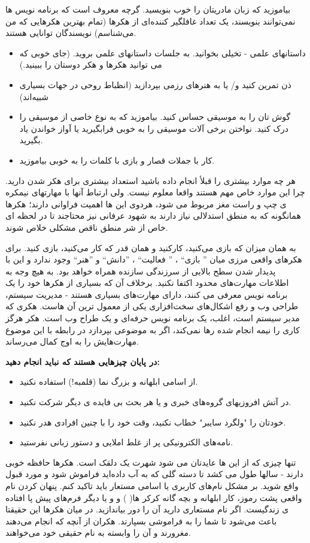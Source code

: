 بیاموزید که زبان مادریتان را خوب بنویسید. گرچه معروف است که برنامه نویس ها نمی‌توانند بنویسند، یک تعداد غافلگیر کننده‌ای از هکرها (تمام بهترین هکرهایی که من می‌شناسم) نویسندگان توانایی هستند.
\begin{itemize}
\item داستانهای علمی - تخیلی بخوانید. به جلسات داستانهای علمی بروید. (جای خوبی که می توانید هکرها و هکر دوستان را ببینید.)
\item ذن تمرین کنید و/ یا به هنرهای رزمی بپردازید (انظباط روحی در جهات بسیاری شبیه‌اند)
\item گوش تان را به موسیقی حساس کنید. بیاموزید که به نوع خاصی از موسیقی را درک کنید. نواختن برخی آلات موسیقی را به خوبی فرابگیرید یا آواز خواندن یاد بگیرید.
\item کار با جملات قصار و بازی با کلمات را به خوبی بیاموزید.
\end{itemize}
هر چه موارد بیشتری را قبلأ انجام داده باشید استعداد بیشتری برای هکر شدن دارید. چرا این موارد خاص مهم هستند واقعا معلوم نیست. ولی ارتباط آنها با مهارتهای نیمکره ی چپ و راست مغز مربوط می شود، هردوی این ها اهمیت فراوانی دارند؛ هکرها همانگونه که به منطق استدلالی نیاز دارند به شهود عرفانی نیز محتاجند تا در لحظه ای خاص از شر منطق ناقص مشکلی خلاص شوند.

به همان میزان که بازی می‌کنید، کارکنید و همان قدر که کار می‌کنید، بازی کنید. برای هکر‌های واقعی مرزی میان ” بازی“ ، ” فعالیت“ ، ”دانش“ و ”هنر“ وجود ندارد و این با پدیدار شدن سطح بالایی از سرزندگی سازنده همراه خواهد بود. به هیچ وجه به اطلاعات مهارت‌های محدود اکتفا نکنید. برخلاف آن که بسیاری از هکرها خود را یک برنامه نویس معرفی می کنند، دارای مهارت‌های بسیاری هستند - مدیریت سیستم، طراحی وب و رفع اشکال‌های سخت‌افزاری 
یکی از معمول ترین آن هاست. هکری که مدیر سیستم است، اغلب، یک برنامه نویس حرفه‌ای و یک طراح وب است. هکر هرگز کاری را نیمه انجام شده رها نمی‌کند، اگر به موضوعی بپردازد در رابطه با این موضوع مهارت‌هایش را به اوج کمال می‌رساند.

\textbf{در پایان چیزهایی هستند که نباید انجام دهید:}
\begin{itemize}
	\item از اسامی ابلهانه و بزرگ نما (قلمبه!) استفاده نکنید.
	\item در آتش افروزیهای گروه‌های خبری و یا هر بحث بی فایده ی دیگر شرکت نکنید.
	\item خودتان را "ولگرد سایبر" خطاب نکنید، وقت خود را با چنین افرادی هدر نکنید.
	\item نامه‌های الکترونیکی پر از غلط املایی و دستور زبانی نفرستید.
\end{itemize}
تنها چیزی که از این ها عایدتان می شود شهرت یک دلقک است. هکرها حافظه خوبی دارند - سالها طول می کشد تا دسته گلی که به آب داده‌اید فراموش شود و مورد قبول واقع شوید.
بر مشکل نام‌های کاربری یا اسامی مستعار باید تاکید کنم. پنهان کردن نام واقعی پشت رموز، کار ابلهانه و بچه گانه کرکر ها(
) و 
و یا دیگر فرم‌های پیش پا افتاده ی زندگیست. اگر نام مستعاری دارید آن را دور بیاندازید. در میان هکرها این حقیقتا باعث می‌شود تا شما را به فراموشی بسپارند. هکران از آنچه که انجام می‌دهند مغرورند و آن را وابسته به نام حقیقی خود می‌خواهند.

